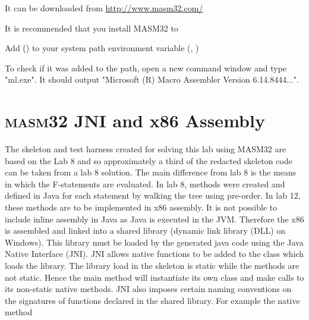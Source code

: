 \item It can be downloaded from \url{http://www.masm32.com/}

\item It is recommended that you install MASM32 to 

\item Add () to your system path environment variable (\ie, )

\item To check if it was added to the path, open a new command window and type "ml.exe". It should output "Microsoft (R) Macro Assembler Version 6.14.8444...".

\ei

\section{\textsc{masm32} JNI and x86 Assembly}

%
The skeleton and test harness created for solving this lab using MASM32 are based on the Lab 8 and so approximately a third of the redacted skeleton code can be taken from a lab 8 solution. The main difference from lab 8 is the means in which the F-statements are evaluated. In lab 8, methods were created and defined in Java for each statement by walking the tree using pre-order. In lab 12, these methods are to be implemented in x86 assembly. It is not possible to include inline assembly in Java as Java is executed in the JVM. Therefore the x86 is assembled and linked into a shared library (dynamic link library (DLL) on Windows). This library must be loaded by the generated java code using the Java Native Interface (JNI). 
%
JNI allows native functions to be added to the class which loads the library. The library load in the skeleton is static while the methods are not static. Hence the main method will instantiate its own class and make calls to its non-static native methods. JNI also imposes certain naming conventions on the signatures of functions declared in the shared library. For example the native method 

